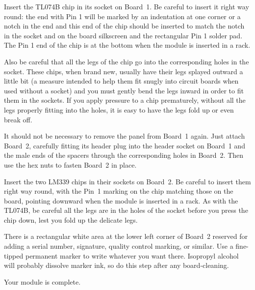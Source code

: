 Insert the TL074B chip in its socket on Board~1.  Be careful to insert it
right way round:  the end with Pin 1 will be marked by an
indentation at one corner or a notch in the end and this end of the chip
should be inserted to match the notch in the socket and on the board
silkscreen and the rectangular Pin 1 solder pad.  The Pin 1 end of the chip
is at the bottom when the module is inserted in a rack.

Also be careful that all the legs of the chip go into the corresponding
holes in the socket.  These chips, when brand new, usually have their legs
splayed outward a little bit (a measure intended to help them fit snugly
into circuit boards when used without a socket) and you must gently bend the
legs inward in order to fit them in the sockets.  If you apply
pressure to a chip prematurely, without all the legs properly fitting into
the holes, it is easy to have the legs fold up or even break off.

It should not be necessary to remove the panel from Board~1 again.  Just
attach Board~2, carefully fitting its header
plug into the header socket on Board~1 and the male ends of the spacers
through the corresponding holes in Board~2.  Then use the hex nuts to fasten
Board~2 in place.

Insert the two LM339 chips in their sockets on Board~2.  Be careful to
insert them right way round, with the Pin~1 marking on the chip matching
those on the board, pointing downward when the module is inserted in a rack. 
As with the TL074B, be careful all the legs are in the holes of the socket
before you press the chip down, lest you fold up the delicate legs.

There is a rectangular white area at the lower left corner of Board~2
reserved for adding a serial number, signature, quality control marking, or
similar.  Use a fine-tipped permanent marker to write whatever you want
there.  Isopropyl alcohol will probably dissolve marker ink, so do this step
after any board-cleaning.

Your module is complete.


